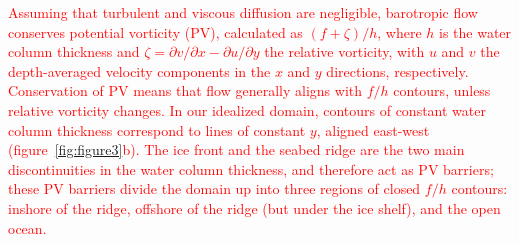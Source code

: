 \documentclass[draft]{agujournal2019}
\newcommand{\red}[1]{\textcolor{red}{#1}}
\begin{document}
 \red{Assuming that turbulent and viscous diffusion are negligible, barotropic flow conserves potential vorticity (PV),  calculated as $(f + \zeta)/h$, where $h$ is the water column thickness and $\zeta = \partial v / \partial x - \partial u / \partial y$ the relative vorticity, with $u$ and $v$ the depth-averaged velocity components in the $x$ and $y$ directions, respectively. Conservation of PV means that flow generally aligns with $f/h$ contours, unless relative vorticity changes. In our idealized domain, contours of constant water column thickness correspond to lines of constant $y$, aligned east-west (figure~\ref{fig:figure3}b). The ice front and the seabed ridge are the two main discontinuities in the water column thickness, and therefore act as PV barriers; these PV barriers divide the domain up into three regions of closed $f/h$ contours: inshore of the ridge, offshore of the ridge (but under the ice shelf), and the open ocean.}
 
 

\end{document}
